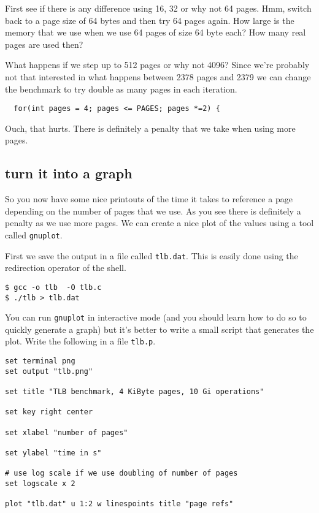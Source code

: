 \documentclass[a4paper,11pt]{article}
\begin{document}
First see if there is any difference using 16, 32 or why not 64
pages. Hmm, switch back to a page size of 64 bytes and then try 64
pages again. How large is the memory that we use when we use 64 pages
of size 64 byte each? How many real pages are used then?

What happens if we step up to 512 pages or why not 4096? Since we're
probably not that interested in what happens between 2378 pages and
2379 we can change the benchmark to try double as many pages in each
iteration.

\begin{lstlisting}
  for(int pages = 4; pages <= PAGES; pages *=2) {
\end{lstlisting}

Ouch, that hurts. There is definitely a penalty that we take when
using more pages. 

\subsection{turn it into a graph}

So you now have some nice printouts of the time it takes to reference a
page depending on the number of pages that we use. As you see there is
definitely a penalty as we use more pages. We can create a nice plot
of the values using a tool called {\tt gnuplot}.

First we save the output in a file called {\tt tlb.dat}. This is
easily done using the redirection operator of the shell.

\begin{verbatim}
$ gcc -o tlb  -O tlb.c
$ ./tlb > tlb.dat
\end{verbatim}

You can run {\tt gnuplot} in interactive mode (and you should
learn how to do so to quickly generate a graph) but it's better to
write a small script that generates the plot. Write the following in a
file {\tt tlb.p}.

\begin{lstlisting}
set terminal png
set output "tlb.png"

set title "TLB benchmark, 4 KiByte pages, 10 Gi operations"

set key right center
    
set xlabel "number of pages"
    
set ylabel "time in s"

# use log scale if we use doubling of number of pages
set logscale x 2      

plot "tlb.dat" u 1:2 w linespoints title "page refs"
\end{lstlisting}
\end{document}
